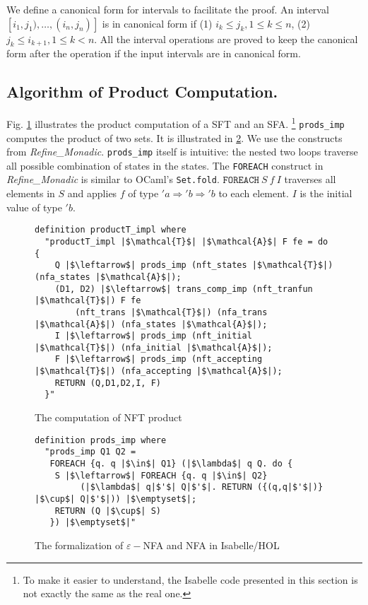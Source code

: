 \documentclass[a4paper,UKenglish,cleveref, autoref, thm-restate]{lipics-v2021}
\begin{document}
We define a canonical form for intervals to facilitate the proof. An interval $[i_1, j_1), \ldots, (i_n, j_n)]$ is in canonical form if 
(1) $i_k \leq j_k, 1 \leq k \leq n$,
(2) $j_k\leq i_{k+1}, 1 \leq k < n$.
All the interval operations are proved to keep the canonical form after the operation if the input intervals are in canonical form.




\subsection{Algorithm of Product Computation.}

Fig. \ref{fig-compute-nft-product} illustrates the product computation of a SFT and an SFA. \footnote{To make it easier to understand, the Isabelle code presented in this section is not exactly the same as the real one.}
\texttt{prods\_imp} computes the product of two sets. It is illustrated in \ref{fig-def-prods_imp}. We use the constructs from \emph{Refine\_Monadic}. \texttt{prods\_imp} itself is intuitive: the nested two loops traverse all possible combination of states in the states. 
The \texttt{FOREACH} construct in \emph{Refine\_Monadic} is similar to OCaml's \texttt{Set.fold}. $\texttt{FOREACH}~S~f~I$ traverses all elements in $S$ and applies $f$ of type $'a \Rightarrow 'b \Rightarrow 'b$ to each element. $I$ is the initial value of type $'b$.



\begin{figure}[hbt!]
	\begin{lstlisting}
definition productT_impl where
  "productT_impl |$\mathcal{T}$| |$\mathcal{A}$| F fe = do {
    Q |$\leftarrow$| prods_imp (nft_states |$\mathcal{T}$|) (nfa_states |$\mathcal{A}$|);
    (D1, D2) |$\leftarrow$| trans_comp_imp (nft_tranfun |$\mathcal{T}$|) F fe 
        (nft_trans |$\mathcal{T}$|) (nfa_trans |$\mathcal{A}$|) (nfa_states |$\mathcal{A}$|);
    I |$\leftarrow$| prods_imp (nft_initial |$\mathcal{T}$|) (nfa_initial |$\mathcal{A}$|);
    F |$\leftarrow$| prods_imp (nft_accepting |$\mathcal{T}$|) (nfa_accepting |$\mathcal{A}$|);
    RETURN (Q,D1,D2,I, F)
  }"
\end{lstlisting}
\caption{The computation of NFT product}
\label{fig-compute-nft-product}
\end{figure}



\begin{figure}[hbt!]
	\begin{lstlisting}
definition prods_imp where
  "prods_imp Q1 Q2 =
   FOREACH {q. q |$\in$| Q1} (|$\lambda$| q Q. do {
    S |$\leftarrow$| FOREACH {q. q |$\in$| Q2}
         (|$\lambda$| q|$'$| Q|$'$|. RETURN ({(q,q|$'$|)} |$\cup$| Q|$'$|)) |$\emptyset$|;
    RETURN (Q |$\cup$| S)
   }) |$\emptyset$|"
\end{lstlisting}
\caption{The formalization of $\varepsilon-$NFA and NFA in Isabelle/HOL}
\label{fig-def-prods_imp}
\end{figure}
\end{document}
